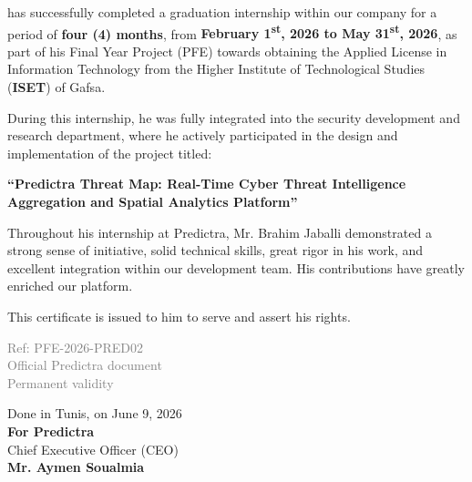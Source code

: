 \documentclass[12pt,a4paper]{article}
\begin{document}
\noindent has successfully completed a graduation internship within our company for a period of \textbf{four (4) months}, from \textbf{February 1\textsuperscript{st}, 2026 to May 31\textsuperscript{st}, 2026}, as part of his Final Year Project (PFE) towards obtaining the Applied License in Information Technology from the Higher Institute of Technological Studies (\textbf{ISET}) of Gafsa.

\vspace{0.25cm}
\noindent During this internship, he was fully integrated into the security development and research department, where he actively participated in the design and implementation of the project titled:

\vspace{0.25cm}
\begin{center}
    \textbf{\textcolor{cyberblue}{``Predictra Threat Map: Real-Time Cyber Threat Intelligence\\ Aggregation and Spatial Analytics Platform''}}
\end{center}

\vspace{0.25cm}
\noindent Throughout his internship at Predictra, Mr. Brahim Jaballi demonstrated a strong sense of initiative, solid technical skills, great rigor in his work, and excellent integration within our development team. His contributions have greatly enriched our platform.

\vspace{0.25cm}
\noindent This certificate is issued to him to serve and assert his rights.

\vspace{0.3cm}

\noindent
\begin{minipage}[t]{0.40\textwidth}
    \begin{flushleft}
        \textcolor{gray}{\scriptsize Ref: PFE-2026-PRED02}\\
        \textcolor{gray}{\scriptsize Official Predictra document}\\
        \textcolor{gray}{\scriptsize Permanent validity}
    \end{flushleft}
\end{minipage}
\hfill
\begin{minipage}[t]{0.55\textwidth}
    \begin{flushright}
        Done in Tunis, on June 9, 2026 \\[0.15cm]
        \textbf{For Predictra} \\
        Chief Executive Officer (CEO) \\[1.8cm]
        \textbf{Mr. Aymen Soualmia}
    \end{flushright}
\end{minipage}
\end{document}
